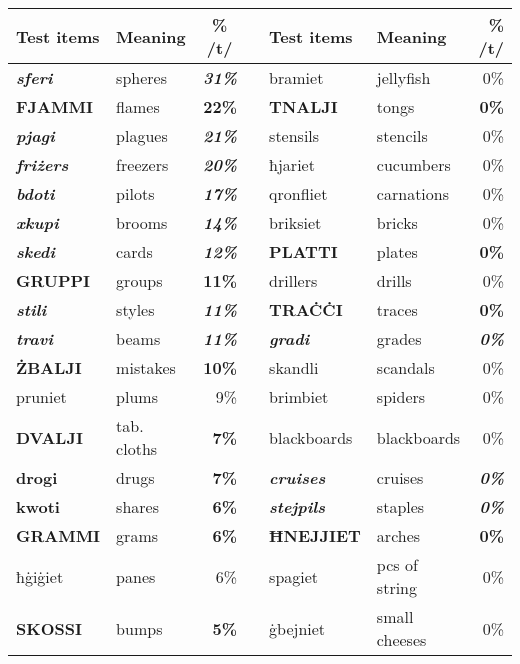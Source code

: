 \documentclass[output=paper]{langsci/langscibook}
\begin{document}
\begin{table}
\begin{tabularx}{\textwidth}{llr X llr}
\lsptoprule
\textbf{Test items} & \textbf{Meaning} & \multicolumn{1}{c}{\textbf{\% /t/}} &  & \textbf{Test items} & \textbf{Meaning} & \textbf{\% /t/}\\
\midrule 
\textbf{\textit{sferi}} & spheres & \textbf{\textit{31\%}} &  & bramiet & jellyfish & 0\%\\
\textbf{FJAMMI} & flames & \textbf{22\%} &  & \textbf{TNALJI} & tongs & \textbf{0\%}\\
\textbf{\textit{pjagi}} & plagues & \textbf{\textit{21\%}} &  & stensils & stencils & 0\%\\
\textbf{\textit{friżers}} & freezers & \textbf{\textit{20\%}} &  & ħjariet & cucumbers & 0\%\\
\textbf{\textit{bdoti}} & pilots & \textbf{\textit{17\%}} &  & qronfliet & carnations & 0\%\\
\textbf{\textit{xkupi}} & brooms & \textbf{\textit{14\%}} &  & briksiet & bricks & 0\%\\
\textbf{\textit{skedi}} & cards & \textbf{\textit{12\%}} &  & \textbf{PLATTI} & plates & \textbf{0\%}\\
\textbf{GRUPPI} & groups & \textbf{11\%} &  & drillers & drills & 0\%\\
\textbf{\textit{stili}} & styles & \textbf{\textit{11\%}} &  & \textbf{TRA\.C\.CI} & traces & \textbf{0\%}\\
\textbf{\textit{travi}} & beams & \textbf{\textit{11\%}} &  & \textbf{\textit{gradi}} & grades & \textbf{\textit{0\%}}\\
\textbf{ŻBALJI} & mistakes & \textbf{10\%} &  & skandli & scandals & 0\%\\
pruniet & plums & 9\% &  & brimbiet & spiders & 0\%\\
\textbf{DVALJI} & tab. cloths & \textbf{7\%} &  & blackboards & blackboards & 0\%\\
\textbf{drogi} & drugs & \textbf{7\%} &  & \textbf{\textit{cruises}} & cruises & \textbf{\textit{0\%}}\\
\textbf{kwoti} & shares & \textbf{6\%} &  & \textbf{\textit{stejpils}} & staples & \textbf{\textit{0\%}}\\
\textbf{GRAMMI} & grams & \textbf{6\%} &  & \textbf{ĦNEJJIET} & arches & \textbf{0\%}\\{}
ħ\.gi\.giet & panes & 6\% &  & spagiet & pcs of string & 0\%\\
\textbf{SKOSSI} & bumps & \textbf{5\%} &  & \.gbejniet & small cheeses & 0\%\\

\end{tabularx}
\end{table}
\end{document}

